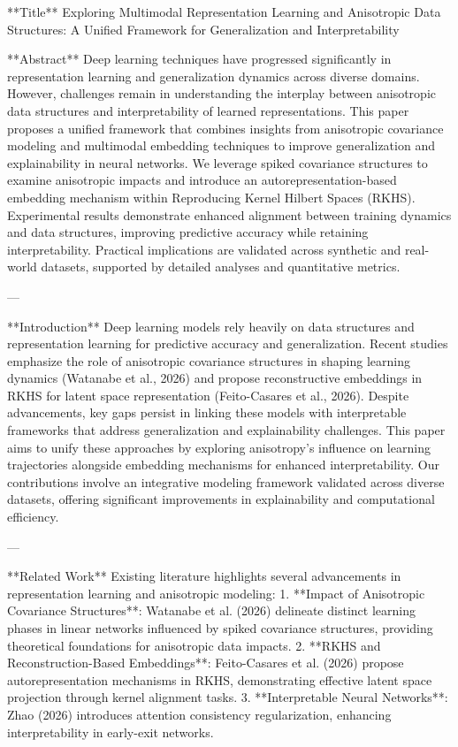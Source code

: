 **Title**  
Exploring Multimodal Representation Learning and Anisotropic Data Structures: A Unified Framework for Generalization and Interpretability  

**Abstract**  
Deep learning techniques have progressed significantly in representation learning and generalization dynamics across diverse domains. However, challenges remain in understanding the interplay between anisotropic data structures and interpretability of learned representations. This paper proposes a unified framework that combines insights from anisotropic covariance modeling and multimodal embedding techniques to improve generalization and explainability in neural networks. We leverage spiked covariance structures to examine anisotropic impacts and introduce an autorepresentation-based embedding mechanism within Reproducing Kernel Hilbert Spaces (RKHS). Experimental results demonstrate enhanced alignment between training dynamics and data structures, improving predictive accuracy while retaining interpretability. Practical implications are validated across synthetic and real-world datasets, supported by detailed analyses and quantitative metrics.  

---

**Introduction**  
Deep learning models rely heavily on data structures and representation learning for predictive accuracy and generalization. Recent studies emphasize the role of anisotropic covariance structures in shaping learning dynamics (Watanabe et al., 2026) and propose reconstructive embeddings in RKHS for latent space representation (Feito-Casares et al., 2026). Despite advancements, key gaps persist in linking these models with interpretable frameworks that address generalization and explainability challenges. This paper aims to unify these approaches by exploring anisotropy's influence on learning trajectories alongside embedding mechanisms for enhanced interpretability. Our contributions involve an integrative modeling framework validated across diverse datasets, offering significant improvements in explainability and computational efficiency.

---

**Related Work**  
Existing literature highlights several advancements in representation learning and anisotropic modeling:  
1. **Impact of Anisotropic Covariance Structures**: Watanabe et al. (2026) delineate distinct learning phases in linear networks influenced by spiked covariance structures, providing theoretical foundations for anisotropic data impacts.  
2. **RKHS and Reconstruction-Based Embeddings**: Feito-Casares et al. (2026) propose autorepresentation mechanisms in RKHS, demonstrating effective latent space projection through kernel alignment tasks.  
3. **Interpretable Neural Networks**: Zhao (2026) introduces attention consistency regularization, enhancing interpretability in early-exit networks.  

